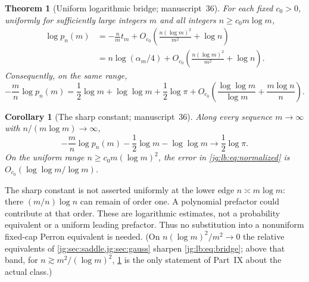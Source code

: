 \documentclass[11pt,a4paper]{article}
\newtheorem{theorem}{Theorem}[section]
\newtheorem{corollary}[corollary]{Corollary}
\theoremstyle{definition}\newaliascnt{definition}{theorem}
\theoremstyle{remark}\newaliascnt{remark}{theorem}
\begin{document}
\begin{theorem}[Uniform logarithmic bridge; manuscript~36]
\label{jg:lb:thm:bridge}
For each fixed $c_0>0$, uniformly for sufficiently large integers $m$ and all
integers $n\ge c_0m\log m$,
\begin{align}
 \log p_n(m)
 &=-\frac nm t_m
   +O_{c_0}\!\left(\frac{n(\log m)^2}{m^2}+\log n\right)\label{jg:lb:eq:bridge}\\
 &=n\log(\alpha_m/4)
   +O_{c_0}\!\left(\frac{n(\log m)^2}{m^2}+\log n\right).\label{jg:lb:eq:spectral}
\end{align}
Consequently, on the same range,
\begin{equation}\label{jg:lb:eq:normalized}
 -\frac mn\log p_n(m)
 =\frac12\log m+\log\log m+\frac12\log\pi
  +O_{c_0}\!\left(\frac{\log\log m}{\log m}+\frac{m\log n}{n}\right).
\end{equation}
\end{theorem}

\begin{corollary}[The sharp constant; manuscript~36]\label{jg:lb:cor:sharp}
Along every sequence $m\to\infty$ with $n/(m\log m)\to\infty$,
\[
 -\frac mn\log p_n(m)-\frac12\log m-\log\log m
 \longrightarrow \frac12\log\pi.
\]
On the uniform range $n\ge c_0m(\log m)^2$, the error in
\eqref{jg:lb:eq:normalized} is $O_{c_0}(\log\log m/\log m)$.
\end{corollary}

The sharp constant is not asserted uniformly at the lower edge
$n\asymp m\log m$: there $(m/n)\log n$ can remain of order one. A polynomial
prefactor could contribute at that order. These are logarithmic estimates, not
a probability equivalent or a uniform leading prefactor. Thus no substitution
into a nonuniform fixed-cap Perron equivalent is needed. (On
$n(\log m)^2/m^2\to0$ the relative equivalents of
\cref{jg:sec:saddle,jg:sec:gauss} sharpen \eqref{jg:lb:eq:bridge}; above that
band, for $n\gtrsim m^2/(\log m)^2$, \cref{jg:lb:thm:bridge} is the only
statement of Part~IX about the actual class.)
\end{document}

